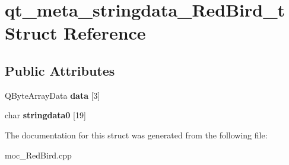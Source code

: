 \hypertarget{structqt__meta__stringdata__RedBird__t}{}\section{qt\+\_\+meta\+\_\+stringdata\+\_\+\+Red\+Bird\+\_\+t Struct Reference}
\label{structqt__meta__stringdata__RedBird__t}
\subsection*{Public Attributes}
\begin{DoxyCompactItemize}
\item 
Q\+Byte\+Array\+Data {\bfseries data} \mbox{[}3\mbox{]}\hypertarget{structqt__meta__stringdata__RedBird__t_ab8560070b8e9bd46a43162bd1496102c}{}\label{structqt__meta__stringdata__RedBird__t_ab8560070b8e9bd46a43162bd1496102c}

\item 
char {\bfseries stringdata0} \mbox{[}19\mbox{]}\hypertarget{structqt__meta__stringdata__RedBird__t_ae978b3998da4483863b0093cdf71f144}{}\label{structqt__meta__stringdata__RedBird__t_ae978b3998da4483863b0093cdf71f144}

\end{DoxyCompactItemize}


The documentation for this struct was generated from the following file\+:\begin{DoxyCompactItemize}
\item 
moc\+\_\+\+Red\+Bird.\+cpp\end{DoxyCompactItemize}

